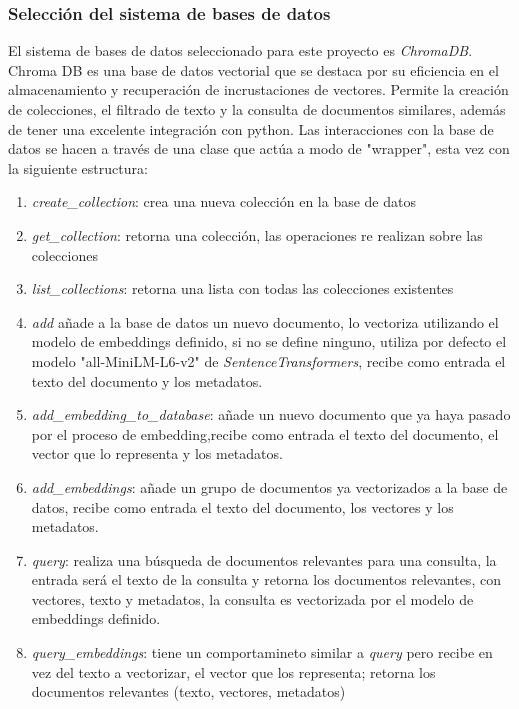         \subsubsection{Selección del sistema de bases de datos}
            El sistema de bases de datos seleccionado para este proyecto es \emph{ChromaDB}\cite{chromadb}. Chroma DB es una base de datos vectorial que se destaca por su eficiencia en el almacenamiento y recuperación de incrustaciones de vectores. Permite la creación de colecciones, el filtrado de texto y la consulta de documentos similares, además de tener una excelente integración con python.
        Las interacciones con la base de datos se hacen a través de una clase que actúa a modo de "wrapper", esta vez con la siguiente estructura:
        \begin{enumerate}
            \item \emph{create\_collection}: crea una nueva colección en la base de datos 
            \item \emph{get\_collection}: retorna una colección, las operaciones re realizan sobre las colecciones
            \item \emph{list\_collections}: retorna una lista con todas las colecciones existentes
            \item \emph{add} añade a la base de datos un nuevo documento, lo vectoriza utilizando el modelo de embeddings definido, si no se define ninguno, utiliza por defecto el modelo "all-MiniLM-L6-v2" de \emph{SentenceTransformers}, recibe como entrada el texto del documento y los metadatos.
            \item \emph{add\_embedding\_to\_database}: añade un nuevo documento que ya haya pasado por el proceso de embedding,recibe como entrada el texto del documento, el vector que lo representa y los metadatos.
            \item \emph{add\_embeddings}: añade un grupo de documentos ya vectorizados a la base de datos, recibe como entrada el texto del documento, los vectores y los metadatos. 
            \item \emph{query}: realiza una búsqueda de documentos relevantes para una consulta, la entrada será el texto  de la consulta y retorna los documentos relevantes, con vectores, texto y metadatos, la consulta es vectorizada por el modelo de embeddings definido.
            \item \emph{query\_embeddings}: tiene un comportamineto similar a \emph{query} pero recibe en vez del texto a vectorizar, el vector que los representa; retorna los documentos relevantes (texto, vectores, metadatos)
        \end{enumerate}

